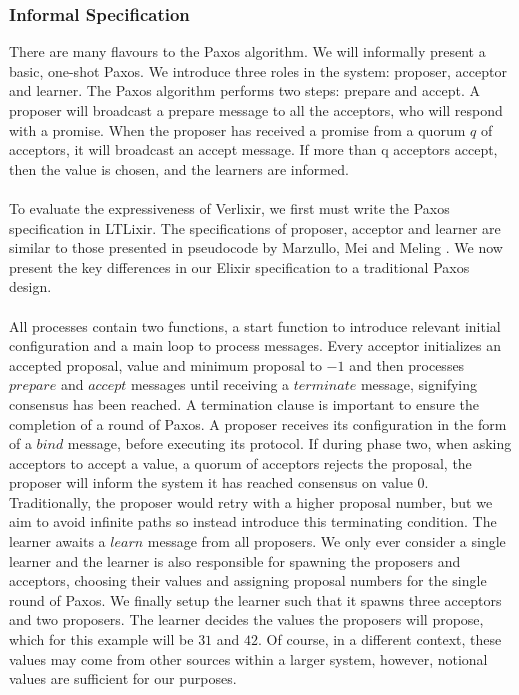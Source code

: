 \subsubsection{Informal Specification}
There are many flavours to the Paxos algorithm. We will informally present a basic, one-shot Paxos. We introduce three roles in the system: proposer, acceptor and learner. The Paxos algorithm performs two steps: prepare and accept. A proposer will broadcast a prepare message to all the acceptors, who will respond with a promise. When the proposer has received a promise from a quorum $q$ of acceptors, it will broadcast an accept message. If more than q acceptors accept, then the value is chosen, and the learners are informed.
\\ \\
To evaluate the expressiveness of Verlixir, we first must write the Paxos specification in LTLixir. The specifications of proposer, acceptor and learner are similar to those presented in pseudocode by Marzullo, Mei and Meling \cite{paxos_pseudocode}. We now present the key differences in our Elixir specification to a traditional Paxos design.
\\ \\
All processes contain two functions, a start function to introduce relevant initial configuration and a main loop to process messages. Every acceptor initializes an accepted proposal, value and minimum proposal to $-1$ and then processes $prepare$ and $accept$ messages until receiving a $terminate$ message, signifying consensus has been reached. A termination clause is important to ensure the completion of a round of Paxos. A proposer receives its configuration in the form of a $bind$ message, before executing its protocol. If during phase two, when asking acceptors to accept a value, a quorum of acceptors rejects the proposal, the proposer will inform the system it has reached consensus on value $0$. Traditionally, the proposer would retry with a higher proposal number, but we aim to avoid infinite paths so instead introduce this terminating condition. The learner awaits a $learn$ message from all proposers. We only ever consider a single learner and the learner is also responsible for spawning the proposers and acceptors, choosing their values and assigning proposal numbers for the single round of Paxos. We finally setup the learner such that it spawns three acceptors and two proposers. The learner decides the values the proposers will propose, which for this example will be $31$ and $42$. Of course, in a different context, these values may come from other sources within a larger system, however, notional values are sufficient for our purposes.
